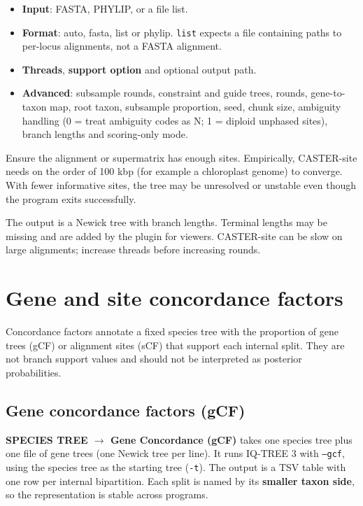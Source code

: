 \documentclass[10pt]{report}
\begin{document}
\begin{itemize}
  \item \textbf{Input}: FASTA, PHYLIP, or a file list.
  \item \textbf{Format}: auto, fasta, list or phylip. \texttt{list} expects a
        file containing paths to per-locus alignments, not a FASTA alignment.
  \item \textbf{Threads}, \textbf{support option} and optional output path.
  \item \textbf{Advanced}: subsample rounds, constraint and guide trees,
        rounds, gene-to-taxon map, root taxon, subsample proportion, seed,
        chunk size, ambiguity handling (0 = treat ambiguity codes as N;
        1 = diploid unphased sites), branch lengths and scoring-only mode.
\end{itemize}

\begin{warning}
Ensure the alignment or supermatrix has enough sites. Empirically, CASTER-site
needs on the order of 100 kbp (for example a chloroplast genome) to converge.
With fewer informative sites, the tree may be unresolved or unstable even
though the program exits successfully.
\end{warning}

The output is a Newick tree with branch lengths. Terminal lengths may be
missing and are added by the plugin for viewers. CASTER-site can be slow on
large alignments; increase threads before increasing rounds.

\section{Gene and site concordance factors}

Concordance factors annotate a fixed species tree with the proportion of gene
trees (gCF) or alignment sites (sCF) that support each internal split. They are
not branch support values and should not be interpreted as posterior
probabilities.

\subsection{Gene concordance factors (gCF)}

\textbf{SPECIES TREE $\rightarrow$ Gene Concordance (gCF)} takes one species
tree plus one file of gene trees (one Newick tree per line). It runs IQ-TREE 3
\cite{iqtree3} with \texttt{--gcf}, using the species tree as the starting tree
(\texttt{-t}). The output is a TSV table with one row per internal
bipartition. Each split is named by its \textbf{smaller taxon side}, so the
representation is stable across programs.
\end{document}
